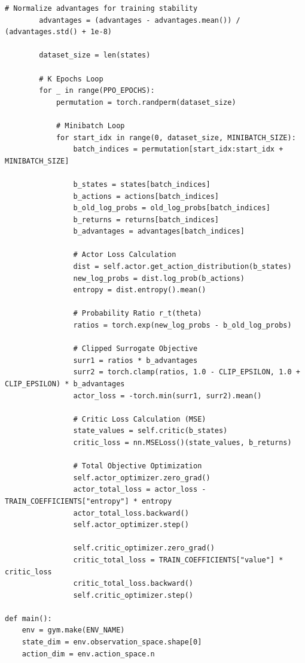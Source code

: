 \documentclass[12pt,a4paper]{article}
\theoremstyle{noteplain}
\theoremstyle{noteexercise}
\begin{document}
\begin{lstlisting}[caption={PPO 算法 PyTorch 实现}, label={lst:ppo}]
        # Normalize advantages for training stability
        advantages = (advantages - advantages.mean()) / (advantages.std() + 1e-8)
        
        dataset_size = len(states)
        
        # K Epochs Loop
        for _ in range(PPO_EPOCHS):
            permutation = torch.randperm(dataset_size)
            
            # Minibatch Loop
            for start_idx in range(0, dataset_size, MINIBATCH_SIZE):
                batch_indices = permutation[start_idx:start_idx + MINIBATCH_SIZE]
                
                b_states = states[batch_indices]
                b_actions = actions[batch_indices]
                b_old_log_probs = old_log_probs[batch_indices]
                b_returns = returns[batch_indices]
                b_advantages = advantages[batch_indices]
                
                # Actor Loss Calculation
                dist = self.actor.get_action_distribution(b_states)
                new_log_probs = dist.log_prob(b_actions)
                entropy = dist.entropy().mean()
                
                # Probability Ratio r_t(theta)
                ratios = torch.exp(new_log_probs - b_old_log_probs)
                
                # Clipped Surrogate Objective
                surr1 = ratios * b_advantages
                surr2 = torch.clamp(ratios, 1.0 - CLIP_EPSILON, 1.0 + CLIP_EPSILON) * b_advantages
                actor_loss = -torch.min(surr1, surr2).mean()
                
                # Critic Loss Calculation (MSE)
                state_values = self.critic(b_states)
                critic_loss = nn.MSELoss()(state_values, b_returns)
                
                # Total Objective Optimization
                self.actor_optimizer.zero_grad()
                actor_total_loss = actor_loss - TRAIN_COEFFICIENTS["entropy"] * entropy
                actor_total_loss.backward()
                self.actor_optimizer.step()
                
                self.critic_optimizer.zero_grad()
                critic_total_loss = TRAIN_COEFFICIENTS["value"] * critic_loss
                critic_total_loss.backward()
                self.critic_optimizer.step()

def main():
    env = gym.make(ENV_NAME)
    state_dim = env.observation_space.shape[0]
    action_dim = env.action_space.n
    

\end{lstlisting}
\end{document}
